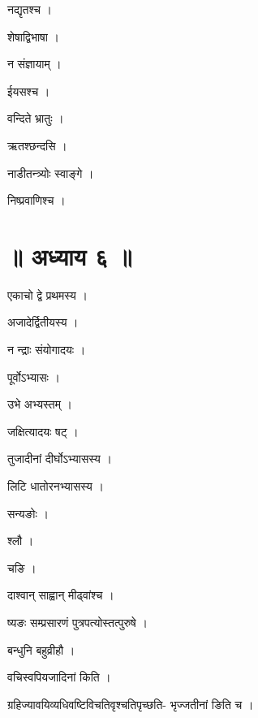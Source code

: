 \documentclass[10pt, openany]{book}
\begin{document}
\noindent नद्यृतश्च ।

\noindent शेषाद्विभाषा ।

\noindent न संज्ञायाम् ।

\noindent ईयसश्च ।

\noindent वन्दिते भ्रातुः ।

\noindent ऋतश्छन्दसि ।

\noindent नाडीतन्त्र्योः स्वाङ्गे ।

\noindent निष्प्रवाणिश्च ।

\section*{॥ अध्याय ६ ॥}

\noindent एकाचो द्वे प्रथमस्य ।

\noindent अजादेर्द्वितीयस्य ।

\noindent न न्द्राः संयोगादयः ।

\noindent पूर्वोऽभ्यासः ।

\noindent उभे अभ्यस्तम् ।

\noindent जक्षित्यादयः षट् ।

\noindent तुजादीनां दीर्घोऽभ्यासस्य ।

\noindent लिटि धातोरनभ्यासस्य ।

\noindent सन्यङोः ।

\noindent श्लौ ।

\noindent चङि ।

\noindent दाश्वान् साह्वान् मीढ्वांश्च ।

\noindent ष्यङः सम्प्रसारणं पुत्रपत्योस्तत्पुरुषे ।

\noindent बन्धुनि बहुव्रीहौ ।

\noindent वचिस्वपियजादिनां किति ।

\noindent ग्रहिज्यावयिव्यधिवष्टिविचतिवृश्चतिपृच्छति- भृज्जतीनां ङिति च ।
\end{document}

